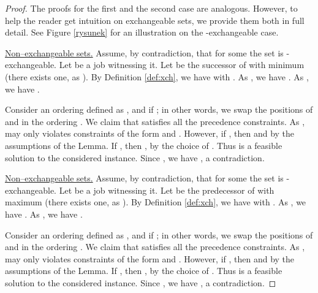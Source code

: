 \documentclass{article}
\theoremstyle{definition}
\begin{document}
\begin{proof}
The proofs for the first and the second case are analogous. However, to help the reader get intuition on exchangeable sets, we provide them both in full detail.
See Figure \ref{rysunek} for an illustration on the -exchangeable case.

{\underline{Non--exchangeable sets.}} Assume, by contradiction, that for some  the set  is -exchangeable.
Let  be a job witnessing it. Let  be the successor of  with minimum  (there exists one, as ). 
By Definition \ref{def:xch}, we have  with .
As , we have . As , we have .

Consider an ordering  defined as ,  and  if ;
in other words, we swap the positions of  and  in the ordering . We claim that  satisfies all the precedence constraints.
As ,  may only violates constraints of the form  and . However, if , then 
and  by the assumptions of the Lemma.
If , then , by the choice of .
Thus  is a feasible solution to the considered \schedname{} instance. Since , we have , a contradiction.

{\underline{Non--exchangeable sets.}} Assume, by contradiction, that for some  the set  is -exchangeable.
Let  be a job witnessing it. Let  be the predecessor of  with maximum 
(there exists one, as ). 
By Definition \ref{def:xch}, we have  with .
As , we have . As , we have .

Consider an ordering  defined as ,  and  if ;
in other words, we swap the positions of  and  in the ordering . We claim that  satisfies all the precedence constraints.
As ,  may only violates constraints of the form  and . However, if , then 
and  by the assumptions of the Lemma.
If , then , by the choice of .
Thus  is a feasible solution to the considered \schedname{} instance. Since , we have , a contradiction.
\end{proof}
\end{document}
